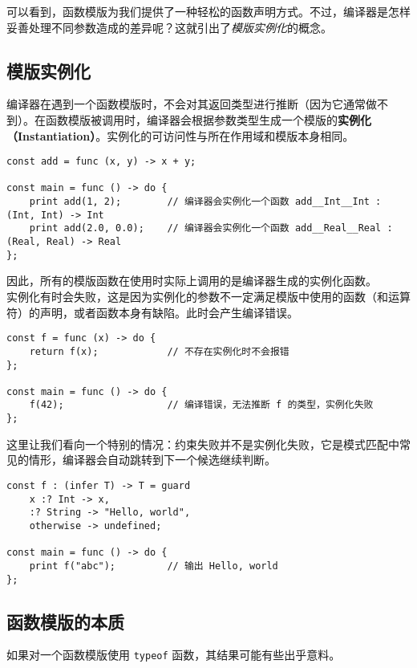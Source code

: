 可以看到，函数模版为我们提供了一种轻松的函数声明方式。不过，编译器是怎样妥善处理不同参数造成的差异呢？这就引出了\emph{模版实例化}的概念。

\subsection{模版实例化}

编译器在遇到一个函数模版时，不会对其返回类型进行推断（因为它通常做不到）。在函数模版被调用时，编译器会根据参数类型生成一个模版的\textbf{实例化（Instantiation）}。实例化的可访问性与所在作用域和模版本身相同。

\begin{lstlisting}
const add = func (x, y) -> x + y;

const main = func () -> do {
	print add(1, 2);		// 编译器会实例化一个函数 add__Int__Int : (Int, Int) -> Int
	print add(2.0, 0.0);	// 编译器会实例化一个函数 add__Real__Real : (Real, Real) -> Real
};
\end{lstlisting}

因此，所有的模版函数在使用时实际上调用的是编译器生成的实例化函数。 \\

实例化有时会失败，这是因为实例化的参数不一定满足模版中使用的函数（和运算符）的声明，或者函数本身有缺陷。此时会产生编译错误。

\begin{lstlisting}
const f = func (x) -> do {
	return f(x);			// 不存在实例化时不会报错
};

const main = func () -> do {
	f(42);					// 编译错误，无法推断 f 的类型，实例化失败
};
\end{lstlisting}

这里让我们看向一个特别的情况：约束失败并不是实例化失败，它是模式匹配中常见的情形，编译器会自动跳转到下一个候选继续判断。

\begin{lstlisting}
const f : (infer T) -> T = guard
	x :? Int -> x,
	:? String -> "Hello, world",
	otherwise -> undefined;
	
const main = func () -> do {
	print f("abc");			// 输出 Hello, world
};
\end{lstlisting}

\subsection{函数模版的本质}

如果对一个函数模版使用 \lstinline!typeof! 函数，其结果可能有些出乎意料。

